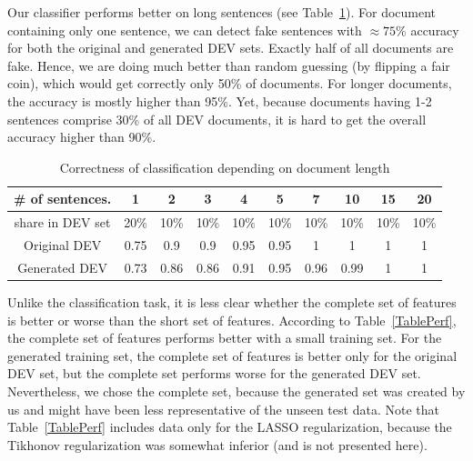 \documentclass[11pt]{article}
\newcommand{\leocomment}[1]{\todo[color=red!40,caption={Leo's comment}]{#1}}
\begin{document}
Our classifier performs better on long sentences (see Table~\ref{TableCorr}).
For document containing only one sentence, we can detect fake sentences with $\approx 75\%$ accuracy
for both the original and generated DEV sets.
Exactly half of all documents are fake. Hence, we are doing much
better than random guessing (by flipping a fair coin), which would get correctly only 50\% of documents.\leocomment{Guys, do you agree with this estimate?}
For longer documents, the accuracy is mostly higher than 95\%.
Yet, because documents having 1-2 sentences comprise 30\% of all DEV documents,
it is hard to get the overall accuracy higher than 90\%.

\begin{table}\centering
\caption{Correctness of classification depending on document length\label{TableCorr}}
\begin{tabular}{c|c|c|c|c|c|c|c|c|c}
\# of sentences.  &  1   &  2   &   3   &  4   &   5   &    7  & 10   & 15   &  20  \\\hline
share in DEV set  & 20\% & 10\% &  10\% & 10\% &  10\% &  10\% & 10\% & 10\% & 10\%  \\\hline\hline
Original DEV      & 0.75 & 0.9  &  0.9  & 0.95 & 0.95  &    1  &   1  &   1  &  1 \\\hline
Generated DEV     & 0.73 & 0.86 &  0.86 & 0.91 & 0.95  &   0.96&  0.99 &  1  &  1 \\\hline
\end{tabular}
\end{table}

Unlike the classification task, it is less clear whether the complete set of features is better or worse
than the short set of features.
According to Table~\ref{TablePerf}, the complete set of features performs better with a small training set.
For the generated training set, the complete set of features is better only for the original DEV set,
but the complete set performs worse for the generated DEV set.
Nevertheless, we chose the complete set,
because the generated set was created by us and might have been less representative of the unseen test data.
Note that Table~\ref{TablePerf} includes data only for the LASSO
regularization, because the Tikhonov regularization was somewhat inferior (and is not presented here).
\end{document}

